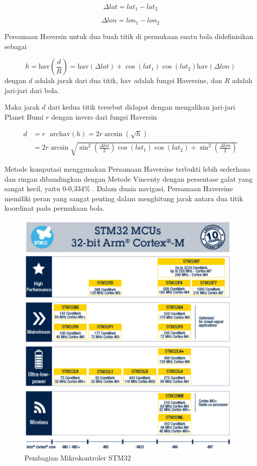 \begin{equation}
	\Delta lat = lat_1 - lat_2
	\label{eq:delt-lat}
\end{equation}

\begin{equation}
	\Delta lon = lon_1 - lon_2
	\label{eq:delt-lon}
\end{equation}


Persamaan Haversin untuk dua buah titik di permukaan suatu bola didefinisikan sebagai

\begin{equation}
	h = \mathrm{hav}\left(\frac{d}{R}\right) = \mathrm{hav}\left(\Delta lat\right) + \cos{\left(lat_1\right)} \cos{\left(lat_2\right)} \mathrm{hav}\left(\Delta lon\right)
	\label{eq:haversine2}
\end{equation}
dengan $d$ adalah jarak dari dua titik, $\mathrm{hav}$ adalah fungsi Haversine, dan $R$ adalah jari-jari dari bola.

Maka jarak $d$ dari kedua titik tersebut didapat dengan mengalikan jari-jari Planet Bumi $r$ dengan invers dari fungsi Haversin \cite{Omatu2013}

$$
\begin{aligned}
	d &= r \text{ }\mathrm{archav}(h) = 2r \arcsin{\left(\sqrt{h}\right)} \\
	&= 2r \arcsin{\sqrt{\sin^2{\left(\frac{\Delta lat}{2}\right)}  \cos{(lat_1)}\cos{(lat_2)} +\sin^2{\left(\frac{\Delta lon}{2}\right)}}}
\end{aligned} 
$$

Metode komputasi menggunakan Persamaan Haversine terbukti lebih sederhana dan ringan dibandingkan dengan Metode Vincenty dengan persentase galat yang sangat kecil, yaitu 0-0,334\% \cite{Mahmoud2016}. Dalam dunia navigasi, Persamaan Haversine memiliki peran yang sangat penting dalam menghitung jarak antara dua titik koordinat pada permukaan bola.

\begin{figure}[H]
	\centering
	\includegraphics[width=11cm]{contents/chapter-2/stm-32-groups.png}
	\caption{Pembagian Mikrokontroler STM32 \cite{STMicroelectronics2023}}
	\label{Fig: stm32-groups}
\end{figure}
